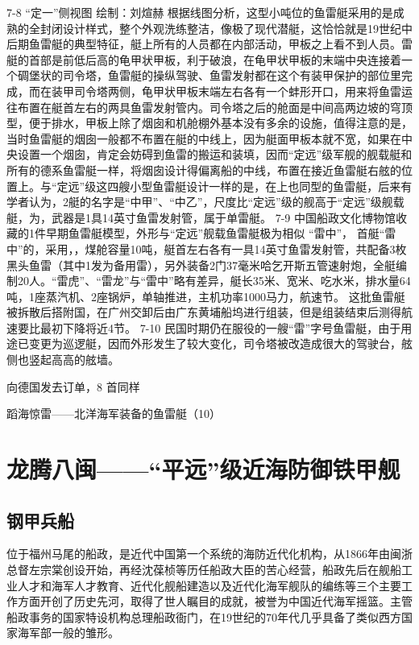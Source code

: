 \documentclass[12pt,UTF8]{ctexbook}
\begin{document}
7-8 “定一”侧视图 绘制：刘煊赫
根据线图分析，这型小吨位的鱼雷艇采用的是成熟的全封闭设计样式，整个外观洗练整洁，像极了现代潜艇，这恰恰就是19世纪中后期鱼雷艇的典型特征，艇上所有的人员都在内部活动，甲板之上看不到人员。雷艇的首部是前低后高的龟甲状甲板，利于破浪，在龟甲状甲板的末端中央连接着一个碉堡状的司令塔，鱼雷艇的操纵驾驶、鱼雷发射都在这个有装甲保护的部位里完成，而在装甲司令塔两侧，龟甲状甲板末端左右各有一个蚌形开口，用来将鱼雷运往布置在艇首左右的两具鱼雷发射管内。司令塔之后的舱面是中间高两边坡的穹顶型，便于排水，甲板上除了烟囱和机舱棚外基本没有多余的设施，值得注意的是，当时鱼雷艇的烟囱一般都不布置在艇的中线上，因为艇面甲板本就不宽，如果在中央设置一个烟囱，肯定会妨碍到鱼雷的搬运和装填，因而“定远”级军舰的舰载艇和所有的德系鱼雷艇一样，将烟囱设计得偏离船的中线，布置在接近鱼雷艇右舷的位置上。与“定远”级这四艘小型鱼雷艇设计一样的是，在上也同型的鱼雷艇，后来有学者认为，2艇的名字是“中甲”、“中乙”，尺度比“定远”级的舰高于“定远”级舰载艇，为，武器是1具14英寸鱼雷发射管，属于单雷艇。
7-9
中国船政文化博物馆收藏的1件早期鱼雷艇模型，外形与“定远”舰载鱼雷艇极为相似
“雷中”， 首艇“雷中”的，采用，，煤舱容量10吨，艇首左右各有一具14英寸鱼雷发射管，共配备3枚黑头鱼雷（其中1发为备用雷），另外装备2门37毫米哈乞开斯五管速射炮，全艇编制20人。“雷虎”、“雷龙”与“雷中”略有差异，艇长35米、宽米、吃水米，排水量64吨，1座蒸汽机、2座锅炉，单轴推进，主机功率1000马力，航速节。 这批鱼雷艇被拆散后搭附国，在广州交卸后由广东黄埔船坞进行组装，但是组装结束后测得航速要比最初下降将近4节。
7-10
民国时期仍在服役的一艘“雷”字号鱼雷艇，由于用途已变更为巡逻艇，因而外形发生了较大变化，司令塔被改造成很大的驾驶台，舷侧也竖起高高的舷墙。

向德国发去订单，8 首同样 

蹈海惊雷——北洋海军装备的鱼雷艇（10）

\chapter{龙腾八闽——“平远”级近海防御铁甲舰}

\section{钢甲兵船}

位于福州马尾的船政，是近代中国第一个系统的海防近代化机构，从1866年由闽浙总督左宗棠创设开始，再经沈葆桢等历任船政大臣的苦心经营，船政先后在舰船工业人才和海军人才教育、近代化舰船建造以及近代化海军舰队的编练等三个主要工作方面开创了历史先河，取得了世人瞩目的成就，被誉为中国近代海军摇篮。主管船政事务的国家特设机构总理船政衙门，在19世纪的70年代几乎具备了类似西方国家海军部一般的雏形。
\end{document}
